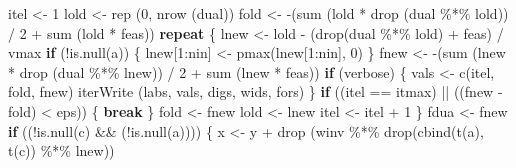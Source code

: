 \documentclass[
  12pt,
]{book}
\newenvironment{Shaded}{\begin{snugshade}}{\end{snugshade}}
\newcommand{\ControlFlowTok}[1]{\textcolor[rgb]{0.13,0.29,0.53}{\textbf{#1}}}
\newcommand{\DecValTok}[1]{\textcolor[rgb]{0.00,0.00,0.81}{#1}}
\newcommand{\FunctionTok}[1]{\textcolor[rgb]{0.00,0.00,0.00}{#1}}
\newcommand{\NormalTok}[1]{#1}
\newcommand{\OtherTok}[1]{\textcolor[rgb]{0.56,0.35,0.01}{#1}}
\newcommand{\SpecialCharTok}[1]{\textcolor[rgb]{0.00,0.00,0.00}{#1}}
\theoremstyle{definition}
\theoremstyle{definition}
\theoremstyle{definition}
\theoremstyle{definition}
\theoremstyle{remark}
\begin{document}
\begin{Shaded}
\begin{Highlighting}[]
\NormalTok{    itel }\OtherTok{\textless{}{-}} \DecValTok{1}
\NormalTok{    lold }\OtherTok{\textless{}{-}} \FunctionTok{rep}\NormalTok{ (}\DecValTok{0}\NormalTok{, }\FunctionTok{nrow}\NormalTok{ (dual))}
\NormalTok{    fold }\OtherTok{\textless{}{-}}
      \SpecialCharTok{{-}}\NormalTok{(}\FunctionTok{sum}\NormalTok{ (lold }\SpecialCharTok{*} \FunctionTok{drop}\NormalTok{ (dual }\SpecialCharTok{\%*\%}\NormalTok{ lold)) }\SpecialCharTok{/} \DecValTok{2} \SpecialCharTok{+}
          \FunctionTok{sum}\NormalTok{ (lold }\SpecialCharTok{*}\NormalTok{ feas))}
    \ControlFlowTok{repeat}\NormalTok{ \{}
\NormalTok{      lnew }\OtherTok{\textless{}{-}}\NormalTok{ lold }\SpecialCharTok{{-}}\NormalTok{ (}\FunctionTok{drop}\NormalTok{(dual }\SpecialCharTok{\%*\%}\NormalTok{ lold) }\SpecialCharTok{+}\NormalTok{ feas) }\SpecialCharTok{/}\NormalTok{ vmax}
      \ControlFlowTok{if}\NormalTok{ (}\SpecialCharTok{!}\FunctionTok{is.null}\NormalTok{(a)) \{}
\NormalTok{        lnew[}\DecValTok{1}\SpecialCharTok{:}\NormalTok{nin] }\OtherTok{\textless{}{-}} \FunctionTok{pmax}\NormalTok{(lnew[}\DecValTok{1}\SpecialCharTok{:}\NormalTok{nin], }\DecValTok{0}\NormalTok{)}
\NormalTok{      \}}
\NormalTok{      fnew }\OtherTok{\textless{}{-}}
        \SpecialCharTok{{-}}\NormalTok{(}\FunctionTok{sum}\NormalTok{ (lnew }\SpecialCharTok{*} \FunctionTok{drop}\NormalTok{ (dual }\SpecialCharTok{\%*\%}\NormalTok{ lnew)) }\SpecialCharTok{/} \DecValTok{2} \SpecialCharTok{+} \FunctionTok{sum}\NormalTok{ (lnew }\SpecialCharTok{*}\NormalTok{ feas))}
      \ControlFlowTok{if}\NormalTok{ (verbose) \{}
\NormalTok{        vals }\OtherTok{\textless{}{-}} \FunctionTok{c}\NormalTok{(itel, fold, fnew)}
        \FunctionTok{iterWrite}\NormalTok{ (labs, vals, digs, wids, fors)}
\NormalTok{      \}}
      \ControlFlowTok{if}\NormalTok{ ((itel }\SpecialCharTok{==}\NormalTok{ itmax) }\SpecialCharTok{||}\NormalTok{ ((fnew }\SpecialCharTok{{-}}\NormalTok{ fold) }\SpecialCharTok{\textless{}}\NormalTok{ eps)) \{}
        \ControlFlowTok{break}
\NormalTok{      \}}
\NormalTok{      fold }\OtherTok{\textless{}{-}}\NormalTok{ fnew}
\NormalTok{      lold }\OtherTok{\textless{}{-}}\NormalTok{ lnew}
\NormalTok{      itel }\OtherTok{\textless{}{-}}\NormalTok{ itel }\SpecialCharTok{+} \DecValTok{1}
\NormalTok{    \}}
\NormalTok{    fdua }\OtherTok{\textless{}{-}}\NormalTok{ fnew}
    \ControlFlowTok{if}\NormalTok{ ((}\SpecialCharTok{!}\FunctionTok{is.null}\NormalTok{(c) }\SpecialCharTok{\&\&}\NormalTok{ (}\SpecialCharTok{!}\FunctionTok{is.null}\NormalTok{(a)))) \{}
\NormalTok{      x }\OtherTok{\textless{}{-}}\NormalTok{ y }\SpecialCharTok{+} \FunctionTok{drop}\NormalTok{ (winv }\SpecialCharTok{\%*\%} \FunctionTok{drop}\NormalTok{(}\FunctionTok{cbind}\NormalTok{(}\FunctionTok{t}\NormalTok{(a), }\FunctionTok{t}\NormalTok{(c)) }\SpecialCharTok{\%*\%}\NormalTok{ lnew))}

\end{Highlighting}
\end{Shaded}
\end{document}

